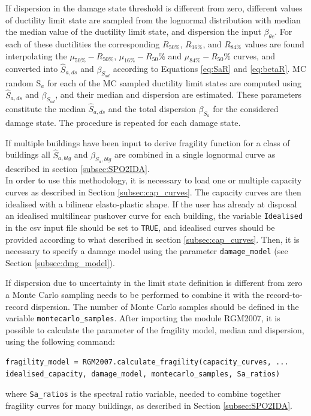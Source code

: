 If dispersion in the damage state threshold is different from zero, different values of ductility limit state are sampled from the lognormal distribution with median the median value of the ductility limit state, and dispersion the input $\beta_{\theta c}$. For each of these ductilities the corresponding $R_{50\%}$, $R_{16\%}$, and $R_{84\%}$ values are found interpolating the $\mu_{50\%}-R_{50\%}$, $\mu_{16\%}-R_50\%$ and $\mu_{84\%}-R_50\%$ curves, and converted into $\hat{S}_{a,ds}$ and $\beta_{S_{a d}}$ according to Equations \ref{eq:SaR} and \ref{eq:betaR}. MC random S$_a$ for each of the MC sampled ductility limit states are computed using $\hat{S}_{a,ds}$ and $\beta_{S_{a d}}$, and their median and dispersion are estimated. These parameters constitute the median $\hat{S}_{a,ds}$ and the total dispersion $\beta_{S_a}$ for the considered damage state. The procedure is repeated for each damage state.

If multiple buildings have been input to derive fragility function for a class of buildings all $\hat{S}_{a, blg}$ and $\beta_{S_a, blg}$ are combined in a single lognormal curve as described in section \ref{subsec:SPO2IDA}.\\

In order to use this methodology, it is necessary to load one or multiple capacity curves as described in Section \ref{subsec:cap_curves}. The capacity curves are then idealised with a bilinear elasto-plastic shape. If the user has already at disposal an idealised multilinear pushover curve for each building, the variable \verb=Idealised= in the csv input file should be set to \verb=TRUE=, and idealised curves should be provided according to what described in section \ref{subsec:cap_curves}. Then, it is necessary to specify a damage model using the parameter \verb=damage_model= (see Section \ref{subsec:dmg_model}).

If dispersion due to uncertainty in the limit state definition is different from zero a Monte Carlo sampling needs to be performed to combine it with the record-to-record dispersion. The number of Monte Carlo samples should be defined in the variable \verb=montecarlo_samples=.
After importing the module RGM2007, it is possible to calculate the parameter of the fragility model, median and dispersion, using the following command:

\begin{Verbatim}[frame=single, commandchars=\\\{\}, samepage=true]
fragility_model = RGM2007.calculate_fragility(capacity_curves, ...
idealised_capacity, damage_model, montecarlo_samples, Sa_ratios)
\end{Verbatim}

where \verb=Sa_ratios= is the spectral ratio variable, needed to combine together fragility curves for many buildings, as described in Section \ref{subsec:SPO2IDA}.